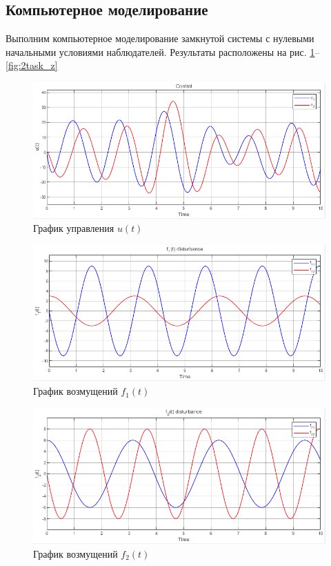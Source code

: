 \documentclass[a4paper, 12pt]{article}
\begin{document}
    \subsection{Компьютерное моделирование}
    Выполним компьютерное моделирование замкнутой системы
    с нулевыми начальными условиями наблюдателей. Результаты
    расположены на рис. \ref{fig:2task_u}--\ref{fig:2task_z}
    \begin{figure}[H]
        \centering
        \includegraphics[scale=0.75]{2task_u.png}
        \captionsetup{skip=0pt}
        \caption{График управления $u(t)$}
        \label{fig:2task_u}
    \end{figure}
    \begin{figure}[H]
        \centering
        \includegraphics[scale=0.75]{2task_f1.png}
        \captionsetup{skip=0pt}
        \caption{График возмущений $f_1(t)$}
        \label{fig:2task_f1}
    \end{figure}
    \begin{figure}[H]
        \centering
        \includegraphics[scale=0.75]{2task_f2.png}
        \captionsetup{skip=0pt}
        \caption{График возмущений $f_2(t)$}
        \label{fig:2task_f2}
    \end{figure}
\end{document}
